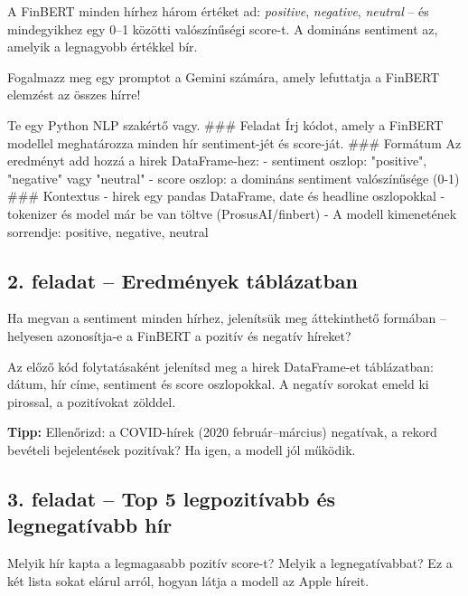 \documentclass[11pt,a4paper]{article}
\newcommand{\tip}[1]{%
  \vspace{3pt}%
  \begin{tcolorbox}[tipstyle]%
  \textbf{\textcolor{tipborder}{Tipp:}} #1%
  \end{tcolorbox}\vspace{2pt}}
\newcommand{\lbl}[1]{\vspace{6pt}\noindent{\small\bfseries\textcolor{labelcolor}{#1}}\par\smallskip}
\begin{document}
\noindent A FinBERT minden hírhez három értéket ad: \textit{positive},
\textit{negative}, \textit{neutral} -- és mindegyikhez egy 0--1 közötti valószínűségi score-t.
A domináns sentiment az, amelyik a legnagyobb értékkel bír.

\bigskip

\lbl{Feladat:}
Fogalmazz meg egy promptot a Gemini számára, amely lefuttatja
a FinBERT elemzést az összes hírre!

\begin{prompt}
Te egy Python NLP szakértő vagy.
### Feladat
Írj kódot, amely a FinBERT modellel meghatározza minden hír
sentiment-jét és score-ját.
### Formátum
Az eredményt add hozzá a hirek DataFrame-hez:
- sentiment oszlop: "positive", "negative" vagy "neutral"
- score oszlop: a domináns sentiment valószínűsége (0-1)
### Kontextus
- hirek egy pandas DataFrame, date és headline oszlopokkal
- tokenizer és model már be van töltve (ProsusAI/finbert)
- A modell kimenetének sorrendje: positive, negative, neutral
\end{prompt}

\bigskip

\subsection{2. feladat -- Eredmények táblázatban}

\noindent Ha megvan a sentiment minden hírhez, jelenítsük meg
áttekinthető formában -- helyesen azonosítja-e a FinBERT
a pozitív és negatív híreket?

\bigskip

\lbl{Feladat:}

\begin{prompt}
Az előző kód folytatásaként jelenítsd meg a hirek DataFrame-et
táblázatban: dátum, hír címe, sentiment és score oszlopokkal.
A negatív sorokat emeld ki pirossal, a pozitívokat zölddel.
\end{prompt}

\tip{Ellenőrizd: a COVID-hírek (2020 február--március) negatívak,
a rekord bevételi bejelentések pozitívak? Ha igen, a modell jól működik.}

\bigskip

\subsection{3. feladat -- Top 5 legpozitívabb és legnegatívabb hír}

\noindent Melyik hír kapta a legmagasabb pozitív score-t?
Melyik a legnegatívabbat? Ez a két lista sokat elárul arról,
hogyan látja a modell az Apple híreit.
\end{document}
